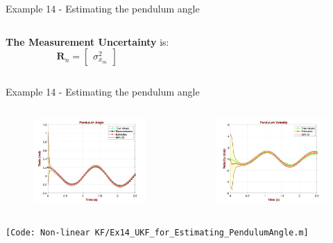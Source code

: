 \begin{frame}{Example 14 - Estimating the pendulum angle}
\begin{columns}
\textbf{The Measurement Uncertainty} is:
\[
\mathbf{R}_n =
\begin{bmatrix}
\sigma^2_{x_m}
\end{bmatrix}
\]
\end{columns}   
\end{frame}

\begin{frame}{Example 14 - Estimating the pendulum angle}
\begin{columns}
        \begin{figure}
            \centering
            \includegraphics[width=0.9\linewidth]{Figures//Part3/Ex14_PendulumAngle_modifiedUKF.png}
        \end{figure}
        \begin{figure}
            \centering
            \includegraphics[width=0.9\linewidth]{Figures//Part3/Ex14_PendulumVelocity_ModifiedUKF.png}
        \end{figure}
\end{columns} 

        \texttt{\tiny [Code: Non-linear KF/Ex14\_UKF\_for\_Estimating\_PendulumAngle.m]}
\end{frame}

